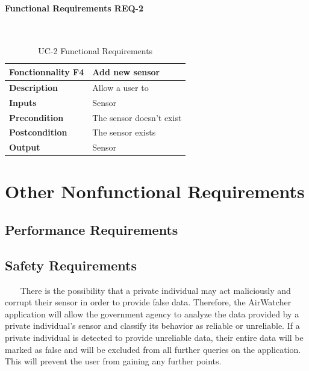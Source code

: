 \documentclass{report}
\begin{document}
\subsubsection*{Functional Requirements REQ-2} ~~~
\begin{table}[H]
	\begin{center}
		\begin{tabular}{|m{4cm}|m{10cm}|}
		\hline
		\textbf{Fonctionnality F4} & Add new sensor \\
		\hline
		\textbf{Description} & Allow a user to  \\
		\hline
		\textbf{Inputs} & Sensor \\
		\hline
		\textbf{Precondition} & The sensor doesn't exist  \\
		\hline
		\textbf{Postcondition} & The sensor exists \\
		\hline
		\textbf{Output} & Sensor \\
		\hline
		\end{tabular}
	\end{center}
	\caption{UC-2 Functional Requirements}
	\label{table:REQ-2}
\end{table}

\chapter{Other Nonfunctional Requirements}

\section{Performance Requirements}

\section{Safety Requirements} ~~~
There is the possibility that a private individual may act maliciously and corrupt their sensor in order
to provide false data. Therefore, the AirWatcher application will allow the government agency to
analyze the data provided by a private individual’s sensor and classify its behavior as reliable or
unreliable. If a private individual is detected to provide unreliable data, their entire data will be
marked as false and will be excluded from all further queries on the application. This will prevent the
user from gaining any further points.
\end{document}

